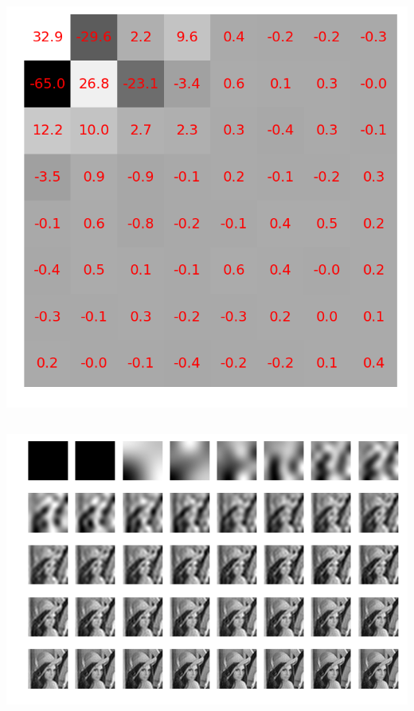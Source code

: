 \documentclass{beamer}
\begin{document}
\begin{frame}
\begin{center}
        \hspace{0.5cm}
        \includegraphics[scale=0.12]{fig/8x8random_dct2.png}
    \end{center}

\end{frame}

\begin{frame}

    \begin{columns}
        \column{\dimexpr\paperwidth-10pt}
        \includegraphics[scale=0.56]{fig/lenas.png}
      \end{columns}

\end{frame}
\end{document}
